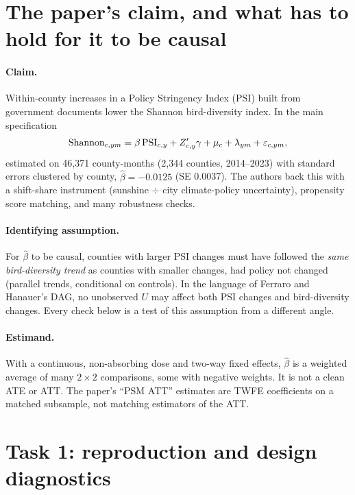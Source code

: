 \documentclass[11pt]{article}
\begin{document}
\tableofcontents

\section{The paper's claim, and what has to hold for it to be causal}

\paragraph{Claim.} Within-county increases in a Policy Stringency Index (PSI) built from government documents lower the Shannon bird-diversity index. In the main specification
\[
\text{Shannon}_{c,ym} = \beta\,\mathrm{PSI}_{c,y} + Z_{c,y}'\gamma + \mu_c + \lambda_{ym} + \varepsilon_{c,ym},
\]
estimated on 46,371 county-months (2,344 counties, 2014--2023) with standard errors clustered by county, $\hat\beta = -0.0125$ (SE 0.0037). The authors back this with a shift-share instrument (sunshine $\div$ city climate-policy uncertainty), propensity score matching, and many robustness checks.

\paragraph{Identifying assumption.} For $\hat\beta$ to be causal, counties with larger PSI changes must have followed the \emph{same bird-diversity trend} as counties with smaller changes, had policy not changed (parallel trends, conditional on controls). In the language of Ferraro and Hanauer's DAG, no unobserved $U$ may affect both PSI changes and bird-diversity changes. Every check below is a test of this assumption from a different angle.

\paragraph{Estimand.} With a continuous, non-absorbing dose and two-way fixed effects, $\hat\beta$ is a weighted average of many $2\times2$ comparisons, some with negative weights. It is not a clean ATE or ATT. The paper's ``PSM ATT'' estimates are TWFE coefficients on a matched subsample, not matching estimators of the ATT.

\section{Task 1: reproduction and design diagnostics}
\end{document}
